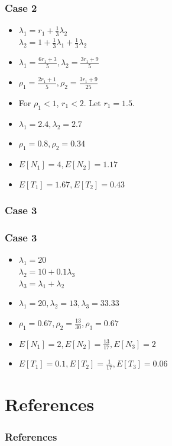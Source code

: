 \documentclass[10pt,notes]{beamer}
\begin{document}
\begin{frame}
    \frametitle{Case 2}
    \begin{itemize}
        \item $\lambda_1 = r_1 + \frac{1}{3}\lambda_2$ \\
            $\lambda_2 = 1 + \frac{1}{3}\lambda_1 + \frac{1}{3}\lambda_2$ \\
        \item $\lambda_1 = \frac{6r_1 + 3}{5}, \lambda_2 = \frac{3r_1 + 9}{5}$
        \item $\rho_1 = \frac{2r_1 + 1}{5}, \rho_2 = \frac{3r_1 + 9}{25}$
        \item For $\rho_1 < 1$, $r_1 < 2$. Let $r_1 = 1.5$.
        \item $\lambda_1 = 2.4, \lambda_2 = 2.7$
        \item $\rho_1 = 0.8, \rho_2 = 0.34$
        \item $E[N_1] = 4, E[N_2] = 1.17$
        \item $E[T_1] = 1.67, E[T_2] = 0.43$
    \end{itemize}
\end{frame}

\begin{frame}
    \frametitle{Case 3}
    \begin{figure}
    \end{figure}
\end{frame}

\begin{frame}
    \frametitle{Case 3}
    \begin{itemize}
        \item $\lambda_1 = 20$ \\
            $\lambda_2 = 10 + 0.1\lambda_3$ \\
            $\lambda_3 = \lambda_1 + \lambda_2$
        \item $\lambda_1 = 20, \lambda_2 = 13, \lambda_3 = 33.33$
        \item $\rho_1 = 0.67, \rho_2 = \frac{13}{30}, \rho_3 = 0.67$
        \item $E[N_1] = 2, E[N_2] = \frac{13}{17}, E[N_3] = 2$
        \item $E[T_1] = 0.1, E[T_2] = \frac{1}{17}, E[T_3] = 0.06$
    \end{itemize}
\end{frame}

\section{References}

\begin{frame}
    \frametitle{References}
    \nocite{*}
    \printbibliography
\end{frame}
\end{document}
